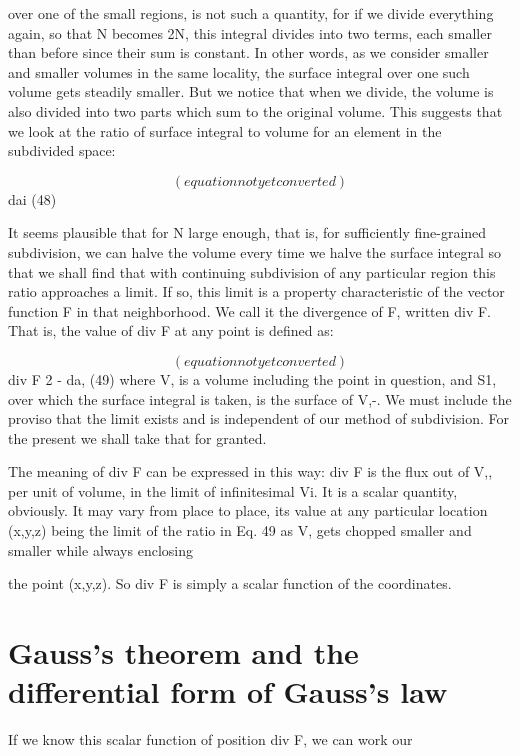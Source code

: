over one of the small regions, is not such a quantity, for if we divide
everything again, so that N becomes 2N, this integral divides into two
terms, each smaller than before since their sum is constant. In other
words, as we consider smaller and smaller volumes in the same
locality, the surface integral over one such volume gets steadily
smaller. But we notice that when we divide, the volume is also
divided into two parts which sum to the original volume. This suggests
that we look at the ratio of surface integral to volume for an
element in the subdivided space:

\begin{equation}
(equation not yet converted)
\end{equation}
 dai (48)

It seems plausible that for N large enough, that is, for sufficiently
fine-grained subdivision, we can halve the volume every time we
halve the surface integral so that we shall find that with continuing
subdivision of any particular region this ratio approaches a limit. If
so, this limit is a property characteristic of the vector function F in
that neighborhood. We call it the divergence of F, written div F.
That is, the value of div F at any point is defined as:

\begin{equation}
(equation not yet converted)
\end{equation}
div F 2  - da, (49)
where V, is a volume including the point in question, and S1, over
which the surface integral is taken, is the surface of V,-. We must include
the proviso that the limit exists and is independent of our
method of subdivision. For the present we shall take that for
granted.

The meaning of div F can be expressed in this way: div F is the
flux out of V,, per unit of volume, in the limit of infinitesimal Vi. It
is a scalar quantity, obviously. It may vary from place to place, its
value at any particular location (x,y,z) being the limit of the ratio in
Eq. 49 as V, gets chopped smaller and smaller while always enclosing

the point (x,y,z). So div F is simply a scalar function of the
coordinates.

\section{Gauss's theorem and the differential form of Gauss's law}

If we know this scalar function of position div F, we can work our

